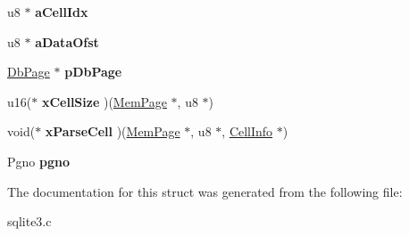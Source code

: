 \begin{DoxyCompactItemize}
\item 
u8 $\ast$ {\bfseries a\+Cell\+Idx}\hypertarget{structMemPage_a6f391f110e68ede6e5234b4e9f678f99}{}\label{structMemPage_a6f391f110e68ede6e5234b4e9f678f99}

\item 
u8 $\ast$ {\bfseries a\+Data\+Ofst}\hypertarget{structMemPage_a0af9fdf5075be66cd5a4932b81072185}{}\label{structMemPage_a0af9fdf5075be66cd5a4932b81072185}

\item 
\hyperlink{structPgHdr}{Db\+Page} $\ast$ {\bfseries p\+Db\+Page}\hypertarget{structMemPage_add322c1aed91e95d8dfe3ac3535d65b4}{}\label{structMemPage_add322c1aed91e95d8dfe3ac3535d65b4}

\item 
u16($\ast$ {\bfseries x\+Cell\+Size} )(\hyperlink{structMemPage}{Mem\+Page} $\ast$, u8 $\ast$)\hypertarget{structMemPage_aecb022d01630da5a48681f8a7e32a419}{}\label{structMemPage_aecb022d01630da5a48681f8a7e32a419}

\item 
void($\ast$ {\bfseries x\+Parse\+Cell} )(\hyperlink{structMemPage}{Mem\+Page} $\ast$, u8 $\ast$, \hyperlink{structCellInfo}{Cell\+Info} $\ast$)\hypertarget{structMemPage_ac401be6009d535d9fef9cc48af734039}{}\label{structMemPage_ac401be6009d535d9fef9cc48af734039}

\item 
Pgno {\bfseries pgno}\hypertarget{structMemPage_ad2b0c532abc799bbcf3b43df4f0b0546}{}\label{structMemPage_ad2b0c532abc799bbcf3b43df4f0b0546}

\end{DoxyCompactItemize}


The documentation for this struct was generated from the following file\+:\begin{DoxyCompactItemize}
\item 
sqlite3.\+c\end{DoxyCompactItemize}
